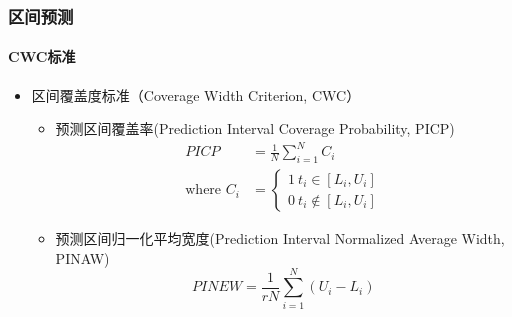 \begin{frame}
\frametitle{区间预测}
\framesubtitle{CWC标准}
\begin{itemize}
    \item<1-> 区间覆盖度标准（Coverage Width Criterion, CWC）
    \begin{itemize}
        \item<1> \scriptsize{预测区间覆盖率(Prediction Interval Coverage Probability, PICP)}
        \begin{equation}
        \begin{aligned}
            PICP &= \frac{1}{N} \sum_{i=1}^{N} C_i \\
            \text{where } C_i &=
                \left\{
                    \begin{array}{rcl}
                    1 \ t_i \in [L_i,U_i] \\
                    0 \ t_i \notin [L_i,U_i]
                    \end{array}
                \right.
        \end{aligned}
        \end{equation}
        \item<1> \scriptsize{预测区间归一化平均宽度(Prediction Interval Normalized Average Width, PINAW)}
        \begin{equation}
            PINEW = \frac{1}{rN} \sum_{i=1}^{N} (U_i - L_i)
        \end{equation}
    \end{itemize}
\end{itemize}
\bigskip
\end{frame}


